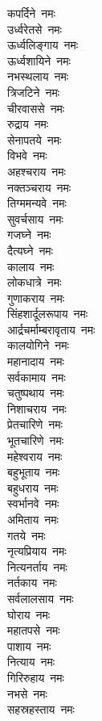 \begin{multicols}{2}
\begin{flushleft}
कपर्दिने~नमः\\
उर्ध्वरेतसे~नमः\\
ऊर्ध्वलिङ्गाय~नमः\\
ऊर्ध्वशायिने~नमः\\
नभस्थलाय~नमः\hfill{}\\
त्रिजटिने~नमः\\
चीरवाससे~नमः\\
रुद्राय~नमः\\
सेनापतये~नमः\\
विभवे~नमः\\
अहश्चराय~नमः\\
नक्तञ्चराय~नमः\\
तिग्ममन्यवे~नमः\\
सुवर्चसाय~नमः\\
गजघ्ने~नमः\hfill{}\\
दैत्यघ्ने~नमः\\
कालाय~नमः\\
लोकधात्रे~नमः\\
गुणाकराय~नमः\\
सिंहशार्दूलरूपाय~नमः\\
आर्द्रचर्माम्बरावृताय~नमः\\
कालयोगिने~नमः\\
महानादाय~नमः\\
सर्वकामाय~नमः\\
चतुष्पथाय~नमः\hfill{}\\
निशाचराय~नमः\\
प्रेतचारिणे~नमः\\
भूतचारिणे~नमः\\
महेश्वराय~नमः\\
बहुभूताय~नमः\\
बहुधराय~नमः\\
स्वर्भानवे~नमः\\
अमिताय~नमः\\
गतये~नमः\\
नृत्यप्रियाय~नमः\hfill{}\\
नित्यनर्ताय~नमः\\
नर्तकाय~नमः\\
सर्वलालसाय~नमः\\
घोराय~नमः\\
महातपसे~नमः\\
पाशाय~नमः\\
नित्याय~नमः\\
गिरिरुहाय~नमः\\
नभसे~नमः\\
सहस्रहस्ताय~नमः\hfill{}\\

\end{flushleft}
\end{multicols}
